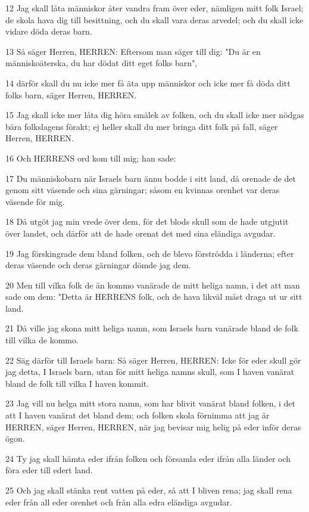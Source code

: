 \par 12 Jag skall låta människor åter vandra fram över eder, nämligen mitt folk Israel; de skola hava dig till besittning, och du skall vara deras arvedel; och du skall icke vidare döda deras barn.
\par 13 Så säger Herren, HERREN: Eftersom man säger till dig: "Du är en människoäterska, du har dödat ditt eget folks barn",
\par 14 därför skall du nu icke mer få äta upp människor och icke mer få döda ditt folks barn, säger Herren, HERREN.
\par 15 Jag skall icke mer låta dig höra smälek av folken, och du skall icke mer nödgas bära folkslagens förakt; ej heller skall du mer bringa ditt folk på fall, säger Herren, HERREN.
\par 16 Och HERRENS ord kom till mig; han sade:
\par 17 Du människobarn när Israels barn ännu bodde i sitt land, då orenade de det genom sitt väsende och sina gärningar; såsom en kvinnas orenhet var deras väsende för mig.
\par 18 Då utgöt jag min vrede över dem, för det blods skull som de hade utgjutit över landet, och därför att de hade orenat det med sina eländiga avgudar.
\par 19 Jag förskingrade dem bland folken, och de blevo förströdda i länderna; efter deras väsende och deras gärningar dömde jag dem.
\par 20 Men till vilka folk de än kommo vanärade de mitt heliga namn, i det att man sade om dem: "Detta är HERRENS folk, och de hava likväl måst draga ut ur sitt land.
\par 21 Då ville jag skona mitt heliga namn, som Israels barn vanärade bland de folk till vilka de kommo.
\par 22 Säg därför till Israels barn: Så säger Herren, HERREN: Icke för eder skull gör jag detta, I Israels barn, utan för mitt heliga namns skull, som I haven vanärat bland de folk till vilka I haven kommit.
\par 23 Jag vill nu helga mitt stora namn, som har blivit vanärat bland folken, i det att I haven vanärat det bland dem; och folken skola förnimma att jag är HERREN, säger Herren, HERREN, när jag bevisar mig helig på eder inför deras ögon.
\par 24 Ty jag skall hämta eder ifrån folken och församla eder ifrån alla länder och föra eder till edert land.
\par 25 Och jag skall stänka rent vatten på eder, så att I bliven rena; jag skall rena eder från all eder orenhet och från alla edra eländiga avgudar.
